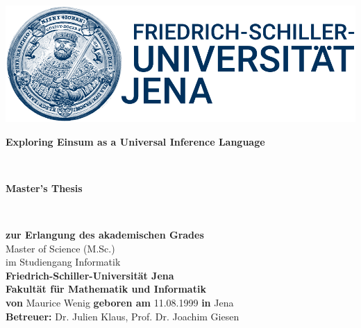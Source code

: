 \documentclass[twoside, 12pt]{scrbook}
\begin{document}
\frontmatter
\thispagestyle{empty}
\begin{titlepage}
	\centering
	\vspace*{3cm}
	\includegraphics{hanfried_logo.png}
	\bigskip\\
	\begin{LARGE}
		\textbf{Exploring Einsum as a Universal Inference Language}
	\end{LARGE}
	\vspace{2cm}\\
	\begin{Large}
		\textbf{Master's Thesis}
	\end{Large}\vspace{3mm}\\
	\begin{large}
		\begin{spacing}{1.6}
			\textbf{zur Erlangung des akademischen Grades}\\
			Master of Science (M.Sc.)\\
			im Studiengang Informatik\vspace{3mm}\\
			\textbf{Friedrich-Schiller-Universität Jena\\
				Fakultät für Mathematik und Informatik}\vspace{3mm}\\
			\textbf{von} Maurice Wenig \textbf{geboren am} 11.08.1999 \textbf{in} Jena\\
			\textbf{Betreuer:} Dr. Julien Klaus, Prof. Dr. Joachim Giesen
		\end{spacing}
	\end{large}
\end{titlepage}
\cleardoublepage


\setcounter{tocdepth}{1}
\tableofcontents


\mainmatter
\fancyhead[LO,RE]{\itshape\nouppercase\leftmark}





\typeout{}


\backmatter

\listoffigures
\listoftables
\appendix

\end{document}
